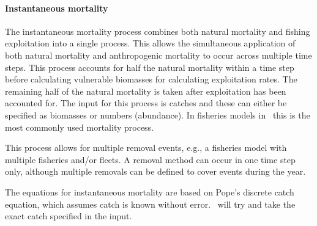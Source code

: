\paragraph{Instantaneous mortality}\label{sec:Process-MortalityInstantaneous}

The instantaneous mortality process combines both natural mortality and fishing exploitation into a single process. This allows the simultaneous application of both natural mortality and anthropogenic mortality to occur across multiple time steps. This process accounts for half the natural mortality within a time step before calculating vulnerable biomasses for calculating exploitation rates. The remaining half of the natural mortality is taken after exploitation has been accounted for. The input for this process is catches and these can either be specified as biomasses or numbers (abundance). In fisheries models in \CNAME\ this is the most commonly used mortality process.

This process allows for multiple removal events, e.g., a fisheries model with multiple fisheries and/or fleets. A removal method can occur in one time step only, although multiple removals can be defined to cover events during the year.

The equations for instantaneous mortality are based on Pope's discrete catch equation, which assumes catch is known without error. \CNAME\ will try and take the exact catch specified in the input.

